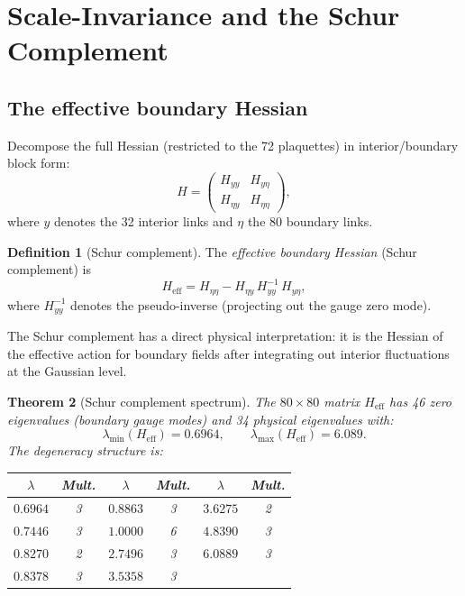\documentclass[11pt]{article}
\newtheorem{theorem}{Theorem}[section]
\theoremstyle{definition}
\newtheorem{definition}[theorem]{Definition}
\begin{document}
\section{Scale-Invariance and the Schur Complement}\label{sec:multiscale}

\subsection{The effective boundary Hessian}

Decompose the full Hessian (restricted to the 72 plaquettes) in
interior/boundary block form:
\begin{equation}\label{eq:blockH}
H=\begin{pmatrix} H_{yy} & H_{y\eta}\\ H_{\eta y} & H_{\eta\eta}
\end{pmatrix},
\end{equation}
where $y$ denotes the 32 interior links and $\eta$ the 80 boundary links.

\begin{definition}[Schur complement]\label{def:schur}
The \emph{effective boundary Hessian} (Schur complement) is
\begin{equation}\label{eq:schur}
H_{\mathrm{eff}}=H_{\eta\eta}-H_{\eta y}\,H_{yy}^{-1}\,H_{y\eta},
\end{equation}
where $H_{yy}^{-1}$ denotes the pseudo-inverse (projecting out the
gauge zero mode).
\end{definition}

The Schur complement has a direct physical interpretation: it is the
Hessian of the effective action for boundary fields after integrating
out interior fluctuations at the Gaussian level.

\begin{theorem}[Schur complement spectrum]\label{thm:schur}
The $80\times 80$ matrix $H_{\mathrm{eff}}$ has 46 zero eigenvalues
(boundary gauge modes) and 34 physical eigenvalues with:
\begin{equation}
\lambda_{\min}(H_{\mathrm{eff}})=0.6964,\qquad
\lambda_{\max}(H_{\mathrm{eff}})=6.089.
\end{equation}
The degeneracy structure is:

\begin{center}
\begin{tabular}{cccccc}
\toprule
$\lambda$ & Mult. & $\lambda$ & Mult. & $\lambda$ & Mult.\\
\midrule
$0.6964$ & 3 & $0.8863$ & 3 & $3.6275$ & 2\\
$0.7446$ & 3 & $1.0000$ & 6 & $4.8390$ & 3\\
$0.8270$ & 2 & $2.7496$ & 3 & $6.0889$ & 3\\
$0.8378$ & 3 & $3.5358$ & 3 & &\\
\bottomrule
\end{tabular}
\end{center}
\end{theorem}
\end{document}
